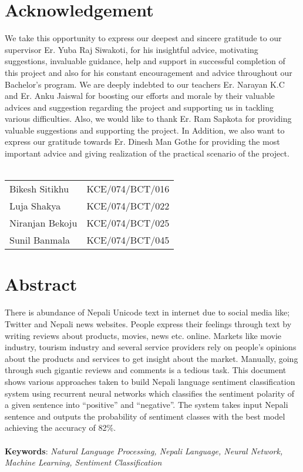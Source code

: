			\chapter*{Acknowledgement}
		\normalsize
		\justify
			We take this opportunity to express our deepest and sincere gratitude to our supervisor
Er. Yuba Raj Siwakoti, for his insightful advice, motivating suggestions, invaluable
guidance, help and support in successful completion of this project and also for his
constant encouragement and advice throughout our Bachelor’s program.
We are deeply indebted to our teachers Er. Narayan K.C and Er. Anku Jaiswal for
boosting our efforts and morale by their valuable advices and suggestion regarding the
project and supporting us in tackling various difficulties.
Also, we would like to thank Er. Ram Sapkota for providing valuable suggestions and
supporting the project.
In Addition, we also want to express our gratitude towards Er. Dinesh Man Gothe for
providing the most important advice and giving realization of the practical scenario of
the project.\\
\\ 
        \begin{table}[hbt!]
            \begin{tabular}{l l}
                Bikesh Sitikhu & KCE/074/BCT/016\\
			    Luja Shakya & KCE/074/BCT/022\\
			    Niranjan Bekoju & KCE/074/BCT/025\\
			    Sunil Banmala & KCE/074/BCT/045\\
		    \end{tabular}
        \end{table}
		\break
		
		\large
			\chapter*{Abstract}
		\normalsize
		\justify
		There is abundance of Nepali Unicode text in internet due to social media like; Twitter
and Nepali news websites. People express their feelings through text by writing reviews
about products, movies, news etc. online. Markets like movie industry, tourism industry
and several service providers rely on people’s opinions about the products and services
to get insight about the market. Manually, going through such gigantic reviews and
comments is a tedious task. This document shows various approaches taken to build
Nepali language sentiment classification system using recurrent neural networks which
classifies the sentiment polarity of a given sentence into “positive” and “negative”. The
system takes input Nepali sentence and outputs the probability of sentiment classes with
the best model achieving the accuracy of 82\%.\\
        \vspace{0.1in}\\
		\textbf{Keywords}: 
		\textit{Natural Language Processing, Nepali Language, Neural Network, Machine Learning, Sentiment Classification}\\

